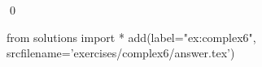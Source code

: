 
\begin{ex} 
  \label{ex:complex6}
  
  \qed
\end{ex} 
\begin{python0}
from solutions import *
add(label="ex:complex6",
    srcfilename='exercises/complex6/answer.tex') 
\end{python0}

